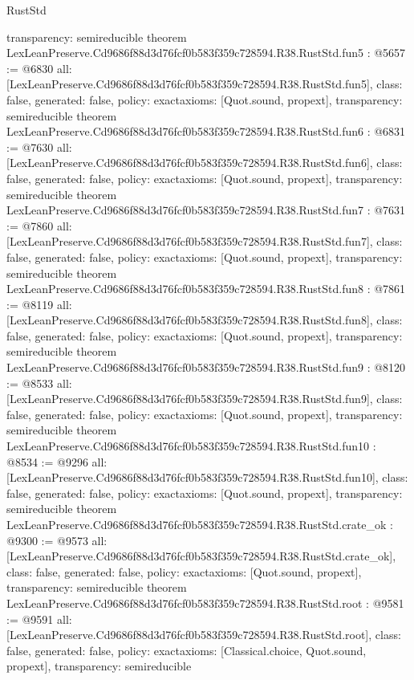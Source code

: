 \begin{lexlean}{RustStd}
\begin{coremodule}
{  transparency: semireducible
}
theorem LexLeanPreserve.Cd9686f88d3d76fcf0b583f359c728594.R38.RustStd.fun5 : @5657 := @6830 {
  all: [LexLeanPreserve.Cd9686f88d3d76fcf0b583f359c728594.R38.RustStd.fun5],
  class: false,
  generated: false,
  policy: exact{axioms: [Quot.sound, propext]},
  transparency: semireducible
}
theorem LexLeanPreserve.Cd9686f88d3d76fcf0b583f359c728594.R38.RustStd.fun6 : @6831 := @7630 {
  all: [LexLeanPreserve.Cd9686f88d3d76fcf0b583f359c728594.R38.RustStd.fun6],
  class: false,
  generated: false,
  policy: exact{axioms: [Quot.sound, propext]},
  transparency: semireducible
}
theorem LexLeanPreserve.Cd9686f88d3d76fcf0b583f359c728594.R38.RustStd.fun7 : @7631 := @7860 {
  all: [LexLeanPreserve.Cd9686f88d3d76fcf0b583f359c728594.R38.RustStd.fun7],
  class: false,
  generated: false,
  policy: exact{axioms: [Quot.sound, propext]},
  transparency: semireducible
}
theorem LexLeanPreserve.Cd9686f88d3d76fcf0b583f359c728594.R38.RustStd.fun8 : @7861 := @8119 {
  all: [LexLeanPreserve.Cd9686f88d3d76fcf0b583f359c728594.R38.RustStd.fun8],
  class: false,
  generated: false,
  policy: exact{axioms: [Quot.sound, propext]},
  transparency: semireducible
}
theorem LexLeanPreserve.Cd9686f88d3d76fcf0b583f359c728594.R38.RustStd.fun9 : @8120 := @8533 {
  all: [LexLeanPreserve.Cd9686f88d3d76fcf0b583f359c728594.R38.RustStd.fun9],
  class: false,
  generated: false,
  policy: exact{axioms: [Quot.sound, propext]},
  transparency: semireducible
}
theorem LexLeanPreserve.Cd9686f88d3d76fcf0b583f359c728594.R38.RustStd.fun10 : @8534 := @9296 {
  all: [LexLeanPreserve.Cd9686f88d3d76fcf0b583f359c728594.R38.RustStd.fun10],
  class: false,
  generated: false,
  policy: exact{axioms: [Quot.sound, propext]},
  transparency: semireducible
}
theorem LexLeanPreserve.Cd9686f88d3d76fcf0b583f359c728594.R38.RustStd.crate_ok : @9300 := @9573 {
  all: [LexLeanPreserve.Cd9686f88d3d76fcf0b583f359c728594.R38.RustStd.crate_ok],
  class: false,
  generated: false,
  policy: exact{axioms: [Quot.sound, propext]},
  transparency: semireducible
}
theorem LexLeanPreserve.Cd9686f88d3d76fcf0b583f359c728594.R38.RustStd.root : @9581 := @9591 {
  all: [LexLeanPreserve.Cd9686f88d3d76fcf0b583f359c728594.R38.RustStd.root],
  class: false,
  generated: false,
  policy: exact{axioms: [Classical.choice, Quot.sound, propext]},
  transparency: semireducible
}


\end{coremodule}
\end{lexlean}
